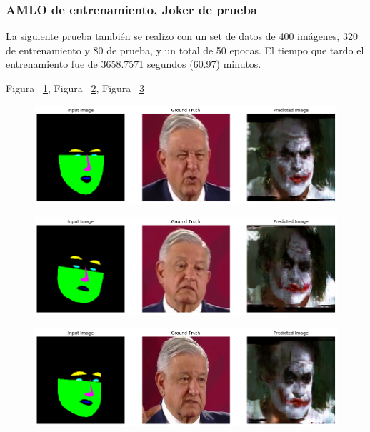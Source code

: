 \documentclass[10pt,journal,compsoc]{IEEEtran}\usepackage[T1]{fontenc}                              %
\begin{document}
\subsubsection{AMLO de entrenamiento, Joker de prueba}

La siguiente prueba también se realizo con un set de datos de 400
imágenes, 320 de entrenamiento y 80 de prueba, y un total de 50 epocas.
El tiempo que tardo el entrenamiento fue de 3658.7571 segundos (60.97)
minutos.

Figura ~\ref{fig:20}, Figura ~\ref{fig:21}, Figura ~\ref{fig:22}

\begin{figure}[!htb]
  \begin{center}
    \includegraphics[width=\linewidth]{./imgs/19_01_amlo_joker.png}
        \caption{}
    \label{fig:20}
  \end{center}
\end{figure}

\begin{figure}[!htb]
  \begin{center}
    \includegraphics[width=\linewidth]{./imgs/19_02_amlo_joker.png}
        \caption{}
    \label{fig:21}
  \end{center}
\end{figure}

\begin{figure}[!htb]
  \begin{center}
    \includegraphics[width=\linewidth]{./imgs/19_03_amlo_joker.png}
        \caption{}
    \label{fig:22}
  \end{center}
\end{figure}
\end{document}
